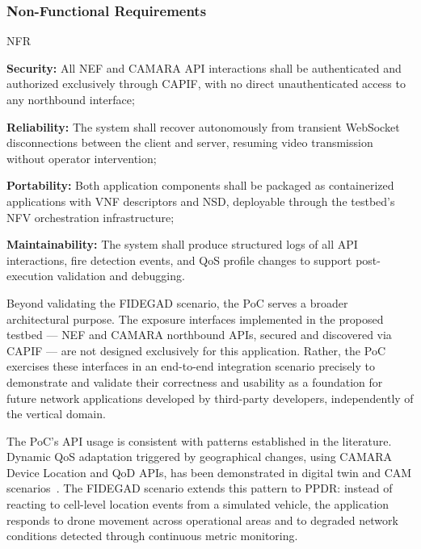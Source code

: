 \subsubsection{Non-Functional Requirements}

\begin{custenumerate}{NFR}
    \item \textbf{Security:} All \acs{NEF} and CAMARA \acs{API} interactions shall be authenticated and authorized exclusively through \acs{CAPIF}, with no direct unauthenticated access to any northbound interface;
    \item \textbf{Reliability:} The system shall recover autonomously from transient \acs{WebSocket} disconnections between the client and server, resuming video transmission without operator intervention;
    \item \textbf{Portability:} Both application components shall be packaged as containerized applications with \acs{VNF} descriptors and \acs{NSD}, deployable through the testbed's \acs{NFV} orchestration infrastructure;
    \item \textbf{Maintainability:} The system shall produce structured logs of all \acs{API} interactions, fire detection events, and \acs{QoS} profile changes to support post-execution validation and debugging.
\end{custenumerate}

Beyond validating the FIDEGAD scenario, the \acs{PoC} serves a broader architectural purpose. The exposure interfaces implemented in the proposed testbed — \acs{NEF} and CAMARA northbound \acsp{API}, secured and discovered via \acs{CAPIF} — are not designed exclusively for this application. Rather, the \acs{PoC} exercises these interfaces in an end-to-end integration scenario precisely to demonstrate and validate their correctness and usability as a foundation for future network applications developed by third-party developers, independently of the vertical domain.

The \acs{PoC}'s \acs{API} usage is consistent with patterns established in the literature. Dynamic \acs{QoS} adaptation triggered by geographical changes, using CAMARA Device Location and \acs{QoD} \acsp{API}, has been demonstrated in digital twin and \acs{CAM} scenarios~\cite{DynamicQoSAdaptationviaExposedServiceAPIs, OnDemandNetworkQoSAdaptation}. The FIDEGAD scenario extends this pattern to \acs{PPDR}: instead of reacting to cell-level location events from a simulated vehicle, the application responds to drone movement across operational areas and to degraded network conditions detected through continuous metric monitoring.

